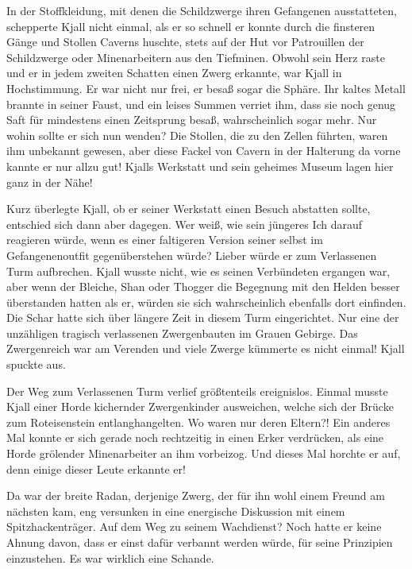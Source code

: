 \documentclass[10pt, a4paper, oneside]{book}
\begin{document}
In der Stoffkleidung, mit denen die Schildzwerge ihren Gefangenen ausstatteten, schepperte Kjall nicht einmal, als er so schnell er konnte durch die finsteren Gänge und Stollen Caverns huschte, stets auf der Hut vor Patrouillen der Schildzwerge oder Minenarbeitern aus den Tiefminen. Obwohl sein Herz raste und er in jedem zweiten Schatten einen Zwerg erkannte, war Kjall in Hochstimmung. Er war nicht nur frei, er besaß sogar die Sphäre. Ihr kaltes Metall brannte in seiner Faust, und ein leises Summen verriet ihm, dass sie noch genug Saft für mindestens einen Zeitsprung besaß, wahrscheinlich sogar mehr. Nur wohin sollte er sich nun wenden? Die Stollen, die zu den Zellen führten, waren ihm unbekannt gewesen, aber diese Fackel von Cavern in der Halterung da vorne kannte er nur allzu gut! Kjalls Werkstatt und sein geheimes Museum lagen hier ganz in der Nähe!

Kurz überlegte Kjall, ob er seiner Werkstatt einen Besuch abstatten sollte, entschied sich dann aber dagegen. Wer weiß, wie sein jüngeres Ich darauf reagieren würde, wenn es einer faltigeren Version seiner selbst im Gefangenenoutfit gegenüberstehen würde? Lieber würde er zum Verlassenen Turm aufbrechen. Kjall wusste nicht, wie es seinen Verbündeten ergangen war, aber wenn der Bleiche, Shan oder Thogger die Begegnung mit den Helden besser überstanden hatten als er, würden sie sich wahrscheinlich ebenfalls dort einfinden. Die Schar hatte sich über längere Zeit in diesem Turm eingerichtet. Nur eine der unzähligen tragisch verlassenen Zwergenbauten im Grauen Gebirge. Das Zwergenreich war am Verenden und viele Zwerge kümmerte es nicht einmal! Kjall spuckte aus.\bigskip



Der Weg zum Verlassenen Turm verlief größtenteils ereignislos. Einmal musste Kjall einer Horde kichernder Zwergenkinder ausweichen, welche sich der Brücke zum Roteisenstein entlanghangelten. Wo waren nur deren Eltern?! Ein anderes Mal konnte er sich gerade noch rechtzeitig in einen Erker verdrücken, als eine Horde grölender Minenarbeiter an ihm vorbeizog. Und dieses Mal horchte er auf, denn einige dieser Leute erkannte er!

Da war der breite Radan, derjenige Zwerg, der für ihn wohl einem Freund am nächsten kam, eng versunken in eine energische Diskussion mit einem Spitzhackenträger. Auf dem Weg zu seinem Wachdienst? Noch hatte er keine Ahnung davon, dass er einst dafür verbannt werden würde, für seine Prinzipien einzustehen. Es war wirklich eine Schande.
\end{document}
